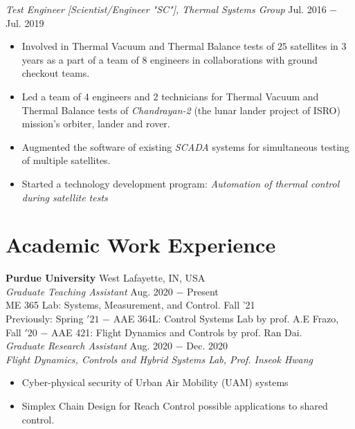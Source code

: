 \documentclass[letterpaper,10pt]{article}
\begin{document}
\vspace{3pt}
\textit{Test Engineer [Scientist/Engineer "SC"], Thermal Systems Group} \hfill Jul. 2016 $-$ Jul. 2019
\begin{itemize}[noitemsep,nolistsep,leftmargin=0.25in,label={--}]
    \item Involved in Thermal Vacuum and Thermal Balance tests of $25$ satellites in 3 years as a part of a team of 8 engineers in collaborations with ground checkout teams.
	\item Led a team of 4 engineers and 2 technicians for Thermal Vacuum and Thermal Balance tests of \textit{Chandrayan-2} (the lunar lander project of ISRO) mission's orbiter, lander and rover.
    \item Augmented the software of existing \textit{SCADA} systems for simultaneous testing of multiple satellites.
	\item Started a technology development program: \textit{Automation of thermal control during satellite tests}
\end{itemize}

\section{Academic Work Experience}
\noindent \textbf{Purdue University} \hfill West Lafayette, IN, USA \\
\vspace{3pt}
\noindent \textit{Graduate Teaching Assistant} \hfill Aug. 2020 $-$ Present\\
ME 365 Lab: Systems, Measurement, and Control.
\hfill Fall '21\\
Previously:
Spring $'21$ $-$ AAE 364L: Control Systems Lab by prof. A.E Frazo,
Fall $'20$ $-$ AAE 421: Flight Dynamics and Controls by prof. Ran Dai.\\
\vspace{3pt}
\noindent \textit{Graduate Research Assistant } \hfill Aug. 2020 $-$ Dec. 2020\\
\textit{Flight Dynamics, Controls and Hybrid Systems Lab, \hfill Prof. Inseok Hwang}
\begin{itemize}[noitemsep,nolistsep,leftmargin=0.25in,label={--}]
    \item Cyber-physical security of Urban Air Mobility (UAM) systems
	\item Simplex Chain Design for Reach Control possible applications to shared control.
\end{itemize}
\end{document}
